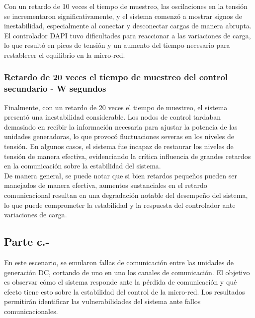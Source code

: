 
Con un retardo de 10 veces el tiempo de muestreo, las oscilaciones en la tensión se incrementaron significativamente, y el sistema comenzó a mostrar signos de inestabilidad, especialmente al conectar y desconectar cargas de manera abrupta. El controlador DAPI tuvo dificultades para reaccionar a las variaciones de carga, lo que resultó en picos de tensión y un aumento del tiempo necesario para restablecer el equilibrio en la micro-red.

\subsubsection{Retardo de 20 veces el tiempo de muestreo del control secundario - W segundos}


Finalmente, con un retardo de 20 veces el tiempo de muestreo, el sistema presentó una inestabilidad considerable. Los nodos de control tardaban demasiado en recibir la información necesaria para ajustar la potencia de las unidades generadoras, lo que provocó fluctuaciones severas en los niveles de tensión. En algunos casos, el sistema fue incapaz de restaurar los niveles de tensión de manera efectiva, evidenciando la crítica influencia de grandes retardos en la comunicación sobre la estabilidad del sistema.\\

De manera general, se puede notar que si bien retardos pequeños pueden ser manejados de manera efectiva, aumentos sustanciales en el retardo comunicacional resultan en una degradación notable del desempeño del sistema, lo que puede comprometer la estabilidad y la respuesta del controlador ante variaciones de carga.

\subsection{Parte c.-}

En este escenario, se emularon fallas de comunicación entre las unidades de generación DC, cortando de uno en uno los canales de comunicación. El objetivo es observar cómo el sistema responde ante la pérdida de comunicación y qué efecto tiene esto sobre la estabilidad del control de la micro-red. Los resultados permitirán identificar las vulnerabilidades del sistema ante fallos comunicacionales.


